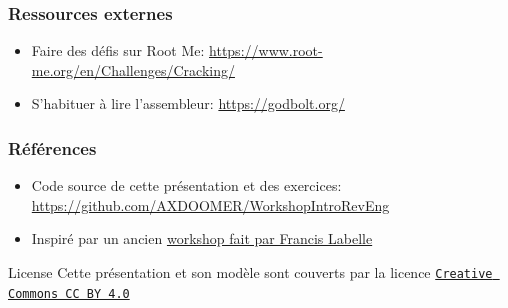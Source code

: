 \documentclass[10pt,xcolor={table,dvipsnames},t]{beamer}
\begin{document}
\fi %

\begin{frame}
    \frametitle{Ressources externes}
    \begin{itemize}
        \item Faire des défis sur Root Me: \url{https://www.root-me.org/en/Challenges/Cracking/}
        \item S'habituer à lire l'assembleur: \url{https://godbolt.org/}
    \end{itemize}
\end{frame}

\begin{frame}
    \frametitle{Références}
    \begin{itemize}
        \item Code source de cette présentation et des exercices: \url{https://github.com/AXDOOMER/WorkshopIntroRevEng}
        \item Inspiré par un ancien \href{https://dciets.com/dci-workshop/security/2017/09/13/re/}{workshop fait par Francis Labelle}
    \end{itemize}
    
    \begin{block}{License}
        Cette présentation et son modèle sont couverts par la licence\newline
        \href{https://www.overleaf.com/latex/templates/uc-berkeley-beamer-theme/bywswngntrws}{\texttt{Creative Commons CC BY 4.0}}
    \end{block}
\end{frame}
\end{document}
